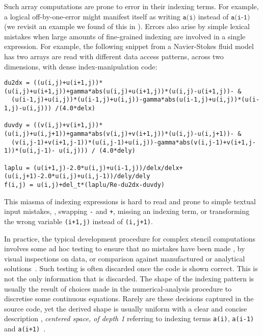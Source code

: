 Such array computations are prone to error in their indexing
terms. For example, a logical off-by-one-error might manifest itself
as writing $\texttt{a(i)}$ instead of $\texttt{a(i-1)}$ (we revisit an
example we found of this in ).
Errors also arise by simple lexical mistakes when large amounts of
fine-grained indexing are involved in a single expression. For
example, the following snippet from a Navier-Stokes
fluid model~\citet{griebel1997numerical} has two arrays are
read with different data access patterns, across two dimensions, with
dense index-manipulation code:
\begin{verbatim}
du2dx = ((u(i,j)+u(i+1,j))*(u(i,j)+u(i+1,j))+gamma*abs(u(i,j)+u(i+1,j))*(u(i,j)-u(i+1,j))- &
  (u(i-1,j)+u(i,j))*(u(i-1,j)+u(i,j))-gamma*abs(u(i-1,j)+u(i,j))*(u(i-1,j)-u(i,j))) /(4.0*delx)

duvdy = ((v(i,j)+v(i+1,j))*(u(i,j)+u(i,j+1))+gamma*abs(v(i,j)+v(i+1,j))*(u(i,j)-u(i,j+1))- &
  (v(i,j-1)+v(i+1,j-1))*(u(i,j-1)+u(i,j))-gamma*abs(v(i,j-1)+v(i+1,j-1))*(u(i,j-1)- u(i,j))) / (4.0*dely)

laplu = (u(i+1,j)-2.0*u(i,j)+u(i-1,j))/delx/delx+(u(i,j+1)-2.0*u(i,j)+u(i,j-1))/dely/dely
f(i,j) = u(i,j)+del_t*(laplu/Re-du2dx-duvdy)
\end{verbatim}
%
This miasma of indexing expressions is hard to read and
prone to simple textual input mistakes, \eg{}, swapping \texttt{-} and
\texttt{+}, missing an indexing term, or transforming the wrong
variable \eg{} \texttt{(i+1,j)} instead of \texttt{(i,j+1)}.

In practice, the typical development procedure for complex stencil
computations involves some ad hoc testing to ensure that no
mistakes have been made \eg{}, by visual inspections on data,
or comparison against manufactured or analytical
solutions~\cite{farrell2010automated}. Such testing is often
discarded once the code is shown correct. This is not the only
information that is discarded. The shape of the indexing pattern
is usually the result of choices made in the numerical-analysis
procedure to discretise some continuous equations. Rarely are these decisions captured in the source code,
yet the derived shape is usually uniform with a 
clear and concise description \eg{}, 
\emph{centered space, of depth 1} referring to indexing
terms \texttt{a(i)}, \texttt{a(i-1)} and
\texttt{a(i+1)}~\cite{recktenwald2004finite}.

